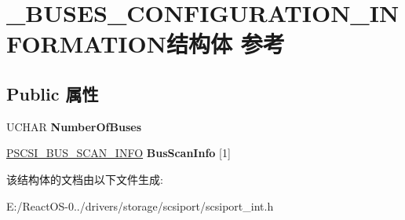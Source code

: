 \hypertarget{struct___b_u_s_e_s___c_o_n_f_i_g_u_r_a_t_i_o_n___i_n_f_o_r_m_a_t_i_o_n}{}\section{\+\_\+\+B\+U\+S\+E\+S\+\_\+\+C\+O\+N\+F\+I\+G\+U\+R\+A\+T\+I\+O\+N\+\_\+\+I\+N\+F\+O\+R\+M\+A\+T\+I\+O\+N结构体 参考}
\label{struct___b_u_s_e_s___c_o_n_f_i_g_u_r_a_t_i_o_n___i_n_f_o_r_m_a_t_i_o_n}
\subsection*{Public 属性}
\begin{DoxyCompactItemize}
\item 
\mbox{\label{struct___b_u_s_e_s___c_o_n_f_i_g_u_r_a_t_i_o_n___i_n_f_o_r_m_a_t_i_o_n_a61721afb537e7e79868dd658a4f27e18}} 
U\+C\+H\+AR {\bfseries Number\+Of\+Buses}
\item 
\mbox{\label{struct___b_u_s_e_s___c_o_n_f_i_g_u_r_a_t_i_o_n___i_n_f_o_r_m_a_t_i_o_n_ab71b7b8a93b2692cdd85c272815622c7}} 
\hyperlink{struct___s_c_s_i___b_u_s___s_c_a_n___i_n_f_o}{P\+S\+C\+S\+I\+\_\+\+B\+U\+S\+\_\+\+S\+C\+A\+N\+\_\+\+I\+N\+FO} {\bfseries Bus\+Scan\+Info} \mbox{[}1\mbox{]}
\end{DoxyCompactItemize}


该结构体的文档由以下文件生成\+:\begin{DoxyCompactItemize}
\item 
E\+:/\+React\+O\+S-\/0../drivers/storage/scsiport/scsiport\+\_\+int.\+h\end{DoxyCompactItemize}
